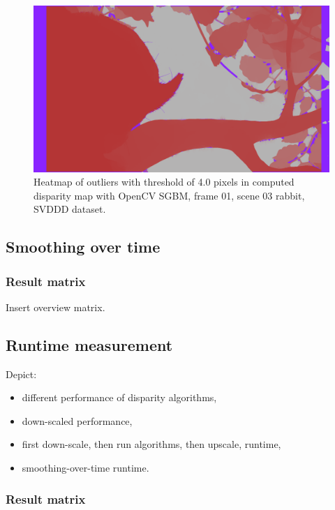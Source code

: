 \begin{figure}[h!]
  \centering
  \includegraphics[width=1.0\textwidth]{src/images/svddd-03-heatmap-outliers.png}
  \caption{Heatmap of outliers with threshold of 4.0 pixels in computed disparity map with OpenCV SGBM, frame 01, scene 03 rabbit, SVDDD dataset.}
  \label{fig:svddd-07}
\end{figure}

\subsection{Smoothing over time}

\subsubsection{Result matrix}

Insert overview matrix.

\subsection{Runtime measurement}

Depict:

\begin{itemize}
  \item different performance of disparity algorithms,
  \item down-scaled performance,
  \item first down-scale, then run algorithms, then upscale, runtime,
  \item smoothing-over-time runtime.
\end{itemize}

\subsubsection{Result matrix}


